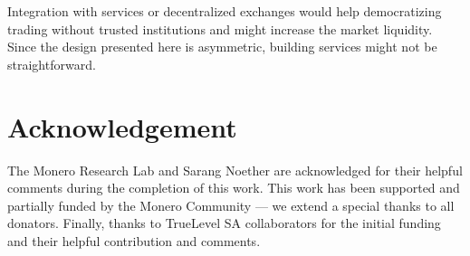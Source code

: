 \documentclass{llncs}
\begin{document}
Integration with services or decentralized exchanges would help democratizing trading without trusted institutions and might increase the market liquidity. Since the design presented here is asymmetric, building services might not be straightforward.

\section{Acknowledgement}
The Monero Research Lab and Sarang Noether are acknowledged for their helpful comments during the completion of this work. This work has been supported and partially funded by the Monero Community --- we extend a special thanks to all donators. Finally, thanks to TrueLevel SA collaborators for the initial funding and their helpful contribution and comments.

%
%
\printbibliography
\end{document}
